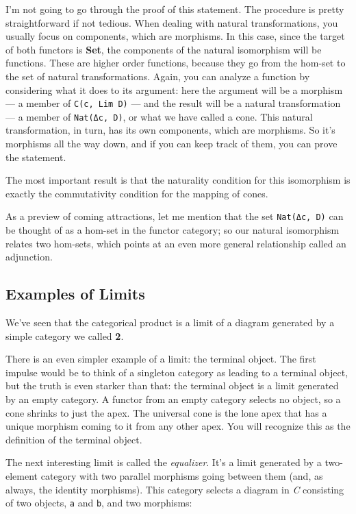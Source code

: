 I'm not going to go through the proof of this statement. The procedure
is pretty straightforward if not tedious. When dealing with natural
transformations, you usually focus on components, which are morphisms.
In this case, since the target of both functors is \textbf{Set}, the
components of the natural isomorphism will be functions. These are
higher order functions, because they go from the hom-set to the set of
natural transformations. Again, you can analyze a function by
considering what it does to its argument: here the argument will be a
morphism --- a member of \texttt{C(c,\ Lim\ D)} --- and the result will
be a natural transformation --- a member of \texttt{Nat(Δc,\ D)}, or
what we have called a cone. This natural transformation, in turn, has
its own components, which are morphisms. So it's morphisms all the way
down, and if you can keep track of them, you can prove the statement.

The most important result is that the naturality condition for this
isomorphism is exactly the commutativity condition for the mapping of
cones.

As a preview of coming attractions, let me mention that the set
\texttt{Nat(Δc,\ D)} can be thought of as a hom-set in the functor
category; so our natural isomorphism relates two hom-sets, which points
at an even more general relationship called an adjunction.

\subsection{Examples of Limits}\label{examples-of-limits}

We've seen that the categorical product is a limit of a diagram
generated by a simple category we called \textbf{2}.

There is an even simpler example of a limit: the terminal object. The
first impulse would be to think of a singleton category as leading to a
terminal object, but the truth is even starker than that: the terminal
object is a limit generated by an empty category. A functor from an
empty category selects no object, so a cone shrinks to just the apex.
The universal cone is the lone apex that has a unique morphism coming to
it from any other apex. You will recognize this as the definition of the
terminal object.

The next interesting limit is called the \emph{equalizer}. It's a limit
generated by a two-element category with two parallel morphisms going
between them (and, as always, the identity morphisms). This category
selects a diagram in \emph{C} consisting of two objects, \texttt{a} and
\texttt{b}, and two morphisms:

